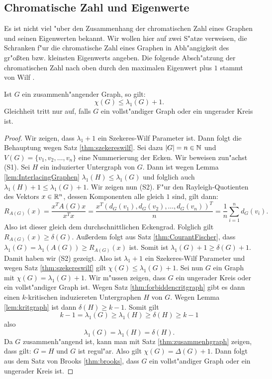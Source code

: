 \subsection{Chromatische Zahl und Eigenwerte}
Es ist nicht viel "uber den Zusammenhang der chromatischen Zahl eines Graphen und seinen Eigenwerten bekannt. Wir wollen hier auf zwei S"atze verweisen, die Schranken f"ur die chromatische Zahl eines Graphen in Abh"angigkeit des gr"o{\ss}ten bzw. kleinsten Eigenwerts angeben. Die folgende Absch"atzung der chromatischen Zahl nach oben durch den maximalen Eigenwert plus $1$ stammt von Wilf \cite{Wilf67}.

\begin{theorem}[Wilf]
  Ist $G$ ein zusammenh"angender Graph, so gilt: 
  $$\chi(G) \leq \lambda_{1}(G) +1.$$
  Gleichheit tritt nur auf, falls $G$ ein vollst"andiger Graph oder ein ungerader Kreis ist.
  \label{thm:wilfev}
\end{theorem}

\begin{proof}
  Wir zeigen, dass $\lambda_{1}+1$ ein Szekeres-Wilf Parameter ist. Dann folgt die Behauptung wegen Satz \ref{thm:szekereswilf}. Sei dazu $|G| = n \in {\mathbb{N}}$ und $V(G)= \{v_1,v_2, \dots , v_n \}$ eine Nummerierung der Ecken. 
  Wir beweisen zun"achst (S1). Sei $H$ ein induzierter Untergraph von $G$. Dann ist wegen Lemma \ref{lem:InterlacingGraphen} $\lambda_{1}(H) \leq \lambda_{1}(G)$ und folglich auch $\lambda_{1}(H) +1 \leq \lambda_{1}(G) +1$.
  Wir zeigen nun (S2). F"ur den Rayleigh-Quotienten des Vektors $x\in {\mathbb{R}}^{n}$, dessen Komponenten alle gleich $1$ sind, gilt dann:
  $$R_{A(G)}(x) = \frac{x^{T}A(G)x}{x^{T}x} = \frac{x^{T}(d_G(v_1),d_G(v_2),\dots, d_G(v_n))^{T}}{n} = \frac{1}{n} \sum\limits_{i=1}^{n} d_G(v_i).$$ 
  Also ist dieser gleich dem durchschnittlichen Eckengrad. Folglich gilt $R_{A(G)}(x) \geq \delta(G)$. Au{\ss}erdem folgt aus Satz \ref{thm:CourantFischer}, dass $\lambda_{1}(G) = \lambda_{1}(A(G)) \geq R_{A(G)}(x)$ ist. Somit ist
  $\lambda_{1}(G) +1 \geq \delta(G) +1$. Damit haben wir (S2) gezeigt. 
  Also ist $\lambda_{1}+1$ ein Szekeres-Wilf Parameter und wegen Satz \ref{thm:szekereswilf} gilt $\chi(G) \leq \lambda_{1}(G) +1 $. 
  Sei nun $G$ ein Graph mit $\chi(G) = \lambda_{1}(G) +1$. Wir m"ussen zeigen, dass $G$ ein ungerader Kreis oder ein vollst"andiger Graph ist.
  Wegen Satz \ref{thm:forbiddencritgraph} gibt es dann einen $k$-kritischen induziereten Untergraphen $H$ von $G$. Wegen Lemma \ref{lem:kritgraph} ist dann $\delta(H) \geq k-1$. Somit gilt 
  $$k-1 = \lambda_{1}(G)  \geq \lambda_{1}(H) \geq \delta(H) \geq k-1$$
  also
  $$\lambda_{1}(G) = \lambda_{1}(H) = \delta(H).$$
  Da $G$ zusammenh"angend ist, kann man mit Satz \ref{thm:zusammenhgraph} zeigen, dass gilt: $G= H$ und $G$ ist regul"ar. Also gilt $\chi(G) = \Delta(G) +1 $. Dann folgt aus dem Satz von Brooks \ref{thm:brooks}, dass $G$ ein vollst"andiger Graph oder ein ungerader Kreis ist. 
\end{proof}

